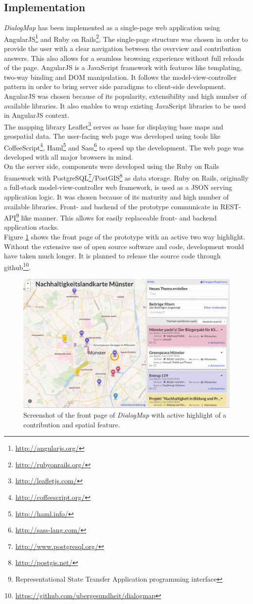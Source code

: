 \subsection{Implementation}
\label{sub:implementation}
\textit{DialogMap} has been implemented as a single-page web application using AngularJS\footnote{\url{http://angularjs.org/}} and Ruby on Rails\footnote{\url{http://rubyonrails.org/}}. The single-page structure was chosen in order to provide the user with a clear navigation between the overview and contribution answers. This also allows for a seamless browsing experience without full reloads of the page. AngularJS is a JavaScript framework with features like templating, two-way binding and DOM manipulation. It follows the model-view-controller pattern in order to bring server side paradigms to client-side development. AngularJS was chosen because of its popularity, extensibility and high number of available libraries. It also enables to wrap existing JavaScript libraries to be used in AngularJS context.\\
The mapping library Leaflet\footnote{\url{http://leafletjs.com/}} serves as base for displaying base maps and geospatial data. The user-facing web page was developed using tools like CoffeeScript\footnote{\url{http://coffeescript.org/}}, Haml\footnote{\url{http://haml.info/}} and Sass\footnote{\url{http://sass-lang.com/}} to speed up the development. The web page was developed with all major browsers in mind.\\
On the server side, components were developed using the Ruby on Rails framework with PostgreSQL\footnote{\url{http://www.postgresql.org/}}/PostGIS\footnote{\url{http://postgis.net/}} as data storage. Ruby on Rails, originally a full-stack model-view-controller web framework, is used as a JSON serving application logic. It was chosen because of its maturity and high number of available libraries. Front- and backend of the prototype communicate in REST-API\footnote{Representational State Transfer Application programming interface} like manner. This allows for easily replaceable front- and backend application stacks.\\
Figure \ref{fig:screenshot} shows the front page of the prototype with an active two way highlight.\\
Without the extensive use of open source software and code, development would have taken much longer. It is planned to release the source code through github\footnote{\url{https://github.com/ubergesundheit/dialogmap}}.

\begin{figure}[!h]
    \centering
    \includegraphics[width=0.9\columnwidth]{images/screenshot}
    \caption{Screenshot of the front page of \textit{DialogMap} with active highlight of a contribution and spatial feature.}
    \label{fig:screenshot}
\end{figure}